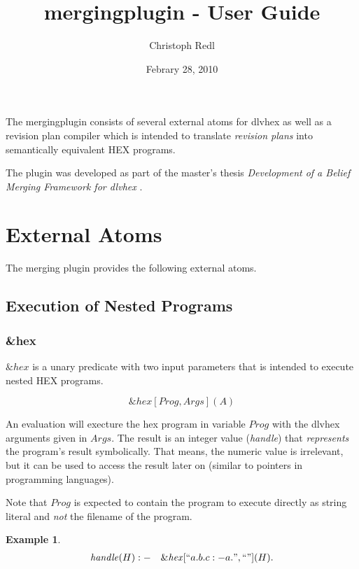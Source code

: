 \documentclass[a4paper,11pt]{article}
\theoremstyle{definition}
\newtheorem{example}{Example}
\newenvironment{mathprogram}[1][P]
	{
		\renewcommand{\ruleimplication}{&:-&}
		\newcommand{\ruledelimiter}{1}
		\begin{eqnarray*}
	}
	{
		\end{eqnarray*}
	}
\newcommand{\ruleimplication}{\ensuremath{\mathit{:-}}}
\newcommand{\hex}{\textsf{HEX}\xspace }
\newcommand{\dlvhex}{\textsf{dlvhex}\xspace }
\begin{document}
	\title{mergingplugin - User Guide}
	\date{Febrary 28, 2010}
	\author{Christoph Redl}
	\maketitle

	The mergingplugin consists of several external atoms for \dlvhex as well as a revision plan compiler which is intended to translate \emph{revision plans} into semantically equivalent
	\hex programs.
	
	The plugin was developed as part of the master's thesis \emph{Development of a Belief Merging Framework for \dlvhex} \cite{CR10BMF}.

	
	\section{External Atoms}
	\label{sec:ExternalAtoms}

	The merging plugin provides the following external atoms.


		\subsection{Execution of Nested Programs}
		\label{sec:ExternalAtoms:Execution}


			\subsubsection{\&hex}

				$\mathit{\&hex}$ is a unary predicate with two input parameters that is intended to execute nested \hex programs.
			
					$$\mathit{\&hex}[\mathit{Prog}, \mathit{Args}](A)$$

				An evaluation will execture the hex program in variable $\mathit{Prog}$ with the \dlvhex arguments given in $\mathit{Args}$. The result is an integer value (\emph{handle})
				that \emph{represents} the program's result symbolically. That means, the numeric value is irrelevant, but it can be used to access the result later on (similar to
				pointers in programming languages).
				
				Note that $\mathit{Prog}$ is expected to contain the program to execute directly as string literal and \emph{not} the filename of the program.
				
				\begin{example}
					\label{ex:Calling1}
					\begin{mathprogram}
\mathit{handle}(H) \ruleimplication \mathit{\&hex}[``a. b. c :- a.", ``"](H).
					\end{mathprogram}
				\end{example}
\end{document}

